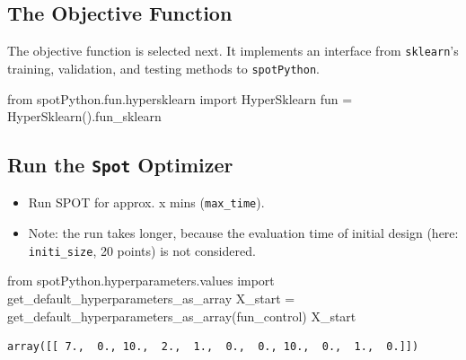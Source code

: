 \documentclass[
  letterpaper,
  DIV=11,
  numbers=noendperiod]{scrreprt}
\newenvironment{Shaded}{\begin{snugshade}}{\end{snugshade}}
\newcommand{\ImportTok}[1]{\textcolor[rgb]{0.00,0.46,0.62}{#1}}
\newcommand{\NormalTok}[1]{\textcolor[rgb]{0.00,0.23,0.31}{#1}}
\newcommand{\OperatorTok}[1]{\textcolor[rgb]{0.37,0.37,0.37}{#1}}
\providecommand{\tightlist}{%
  \setlength{\itemsep}{0pt}\setlength{\parskip}{0pt}}\usepackage{longtable,booktabs,array}
\begin{document}
\hypertarget{sec-the-objective-function-16}{%
\subsection{The Objective
Function}\label{sec-the-objective-function-16}}

The objective function is selected next. It implements an interface from
\texttt{sklearn}'s training, validation, and testing methods to
\texttt{spotPython}.

\begin{Shaded}
\begin{Highlighting}[]
\ImportTok{from}\NormalTok{ spotPython.fun.hypersklearn }\ImportTok{import}\NormalTok{ HyperSklearn}
\NormalTok{fun }\OperatorTok{=}\NormalTok{ HyperSklearn().fun\_sklearn}
\end{Highlighting}
\end{Shaded}

\hypertarget{run-the-spot-optimizer-2}{%
\subsection{\texorpdfstring{Run the \texttt{Spot}
Optimizer}{Run the Spot Optimizer}}\label{run-the-spot-optimizer-2}}

\begin{itemize}
\tightlist
\item
  Run SPOT for approx. x mins (\texttt{max\_time}).
\item
  Note: the run takes longer, because the evaluation time of initial
  design (here: \texttt{initi\_size}, 20 points) is not considered.
\end{itemize}

\begin{Shaded}
\begin{Highlighting}[]
\ImportTok{from}\NormalTok{ spotPython.hyperparameters.values }\ImportTok{import}\NormalTok{ get\_default\_hyperparameters\_as\_array}
\NormalTok{X\_start }\OperatorTok{=}\NormalTok{ get\_default\_hyperparameters\_as\_array(fun\_control)}
\NormalTok{X\_start}
\end{Highlighting}
\end{Shaded}

\begin{verbatim}
array([[ 7.,  0., 10.,  2.,  1.,  0.,  0., 10.,  0.,  1.,  0.]])
\end{verbatim}
\end{document}
